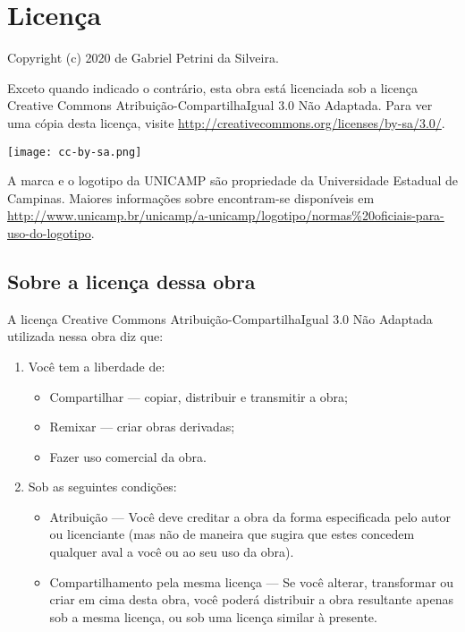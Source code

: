 \chapter{Licença}
Copyright (c) 2020  de Gabriel Petrini da Silveira.

Exceto quando indicado o contrário, esta obra está licenciada sob a licença
Creative Commons Atribuição-CompartilhaIgual 3.0 Não Adaptada. Para ver uma
cópia desta licença, visite
\url{http://creativecommons.org/licenses/by-sa/3.0/}.

\begin{center}
  \texttt{[image: cc-by-sa.png]}
\end{center}


A marca e o logotipo da UNICAMP são propriedade da Universidade Estadual de
Campinas. Maiores informações sobre encontram-se disponíveis em
\url{http://www.unicamp.br/unicamp/a-unicamp/logotipo/normas%20oficiais-para-uso-do-logotipo}.

\section{Sobre a licença dessa obra}
A licença Creative Commons Atribuição-CompartilhaIgual 3.0 Não Adaptada
utilizada nessa obra diz que:
\begin{enumerate}
  \item Você tem a liberdade de:
    \begin{itemize}
      \item Compartilhar — copiar, distribuir e transmitir a obra;
      \item Remixar — criar obras derivadas;
      \item Fazer uso comercial da obra.
    \end{itemize}
  \item Sob as seguintes condições:
    \begin{itemize}
      \item Atribuição — Você deve creditar a obra da forma especificada pelo
        autor ou licenciante (mas não de maneira que sugira que estes concedem
        qualquer aval a você ou ao seu uso da obra).
      \item Compartilhamento pela mesma licença — Se você alterar, transformar
        ou criar em cima desta obra, você poderá distribuir a obra resultante
        apenas sob a mesma licença, ou sob uma licença similar à presente.
    \end{itemize}
\end{enumerate}